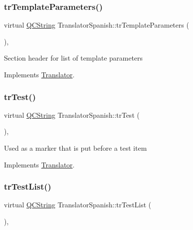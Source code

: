 \subsubsection{\texorpdfstring{trTemplateParameters()}{trTemplateParameters()}}
{\footnotesize\ttfamily virtual \mbox{\hyperlink{class_q_c_string}{Q\+C\+String}} Translator\+Spanish\+::tr\+Template\+Parameters (\begin{DoxyParamCaption}{ }\end{DoxyParamCaption})\hspace{0.3cm}{\ttfamily [inline]}, {\ttfamily [virtual]}}

Section header for list of template parameters 

Implements \mbox{\hyperlink{class_translator}{Translator}}.

\mbox{\label{class_translator_spanish_a6ededeae8a2ac4c0283f2ccd7000ca4a}} 
\subsubsection{\texorpdfstring{trTest()}{trTest()}}
{\footnotesize\ttfamily virtual \mbox{\hyperlink{class_q_c_string}{Q\+C\+String}} Translator\+Spanish\+::tr\+Test (\begin{DoxyParamCaption}{ }\end{DoxyParamCaption})\hspace{0.3cm}{\ttfamily [inline]}, {\ttfamily [virtual]}}

Used as a marker that is put before a test item 

Implements \mbox{\hyperlink{class_translator}{Translator}}.

\mbox{\label{class_translator_spanish_a24671621c3139ae24e7c28d33c5fff48}} 
\subsubsection{\texorpdfstring{trTestList()}{trTestList()}}
{\footnotesize\ttfamily virtual \mbox{\hyperlink{class_q_c_string}{Q\+C\+String}} Translator\+Spanish\+::tr\+Test\+List (\begin{DoxyParamCaption}{ }\end{DoxyParamCaption})\hspace{0.3cm}{\ttfamily [inline]}, {\ttfamily [virtual]}}

